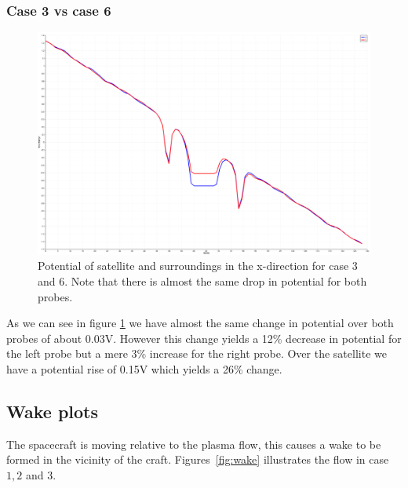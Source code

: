 \subsubsection{Case 3 vs case 6}

\begin{figure}
    \centering
    \includegraphics[width = 0.6 \textwidth]{images/pot_case36_new.png}
    \caption{Potential of satellite and surroundings in the x-direction for case 3 and 6. Note that there is almost the same drop in potential for both probes.}
    \label{fig:pot_case36}
\end{figure}

As we can see in figure \ref{fig:pot_case36} we have almost the same change in potential over both probes of about 0.03V. However this change yields a 12\% decrease in potential for the left probe but a mere 3\% increase for the right probe. Over the satellite we have a potential rise of 0.15V which yields a 26\% change.

\subsection{Wake plots}
	The spacecraft is moving relative to the plasma flow, this causes a wake to be formed in the vicinity of the craft.
 	Figures~\ref{fig:wake} illustrates the flow in case \(1,2\) and \(3\).

